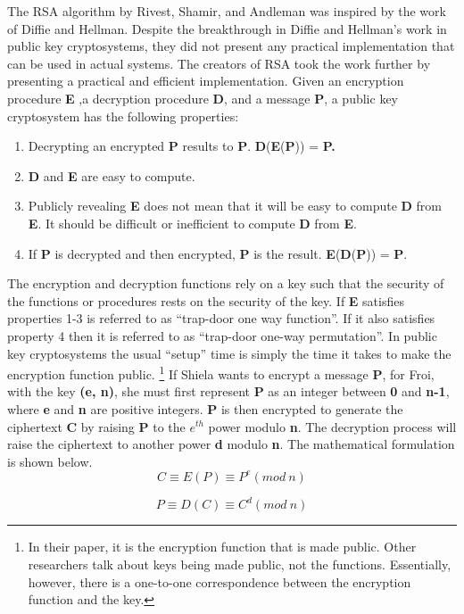 \documentclass{article}
\begin{document}
The RSA algorithm by Rivest, Shamir, and Andleman was inspired by
the work of Diffie and Hellman. Despite the breakthrough in Diffie
and Hellman's work in public key cryptosystems, they did not present
any practical implementation that can be used in actual systems. The
creators of RSA took the work further by presenting a practical and
efficient implementation. Given an encryption procedure \textbf{E}
,a decryption procedure \textbf{D}, and a message \textbf{P}, a public
key cryptosystem has the following properties\cite{rivest_method_1978}:
\begin{enumerate}
\item Decrypting an encrypted \textbf{P} results to \textbf{P}. \textbf{D}(\textbf{E}(\textbf{P}))
= \textbf{P.}
\item \textbf{D} and \textbf{E} are easy to compute.
\item Publicly revealing \textbf{E} does not mean that it will be easy to
compute \textbf{D} from \textbf{E}. It should be difficult or inefficient
to compute \textbf{D} from \textbf{E}.
\item If \textbf{P} is decrypted and then encrypted, \textbf{P} is the result.
\textbf{E}(\textbf{D}(\textbf{P})) = \textbf{P}.
\end{enumerate}
The encryption and decryption functions rely on a key such that the
security of the functions or procedures rests on the security of the
key. If \textbf{E} satisfies properties 1-3 is referred to as ``trap-door
one way function''. If it also satisfies property 4 then it is referred
to as ``trap-door one-way permutation''. In public key cryptosystems
the usual ``setup'' time is simply the time it takes to make the
encryption function public.%
\footnote{In their paper, it is the encryption function that is made public.
Other researchers talk about keys being made public, not the functions.
Essentially, however, there is a one-to-one correspondence between
the encryption function and the key.%
} If Shiela wants to encrypt a message \textbf{P}, for Froi, with the
key \textbf{(e, n)}, she must first represent \textbf{P} as an integer
between \textbf{0} and \textbf{n-1}, where \textbf{e} and \textbf{n}
are positive integers. \textbf{P} is then encrypted to generate the
ciphertext \textbf{C} by raising \textbf{P} to the $e^{th}$ power
modulo \textbf{n}. The decryption process will raise the ciphertext
to another power \textbf{d} modulo \textbf{n}. The mathematical formulation
is shown below. 
\[
C\equiv E(P)\equiv P^{e}(mod\: n)
\]


\[
P\equiv D(C)\equiv C^{d}(mod\: n)
\]
\end{document}
